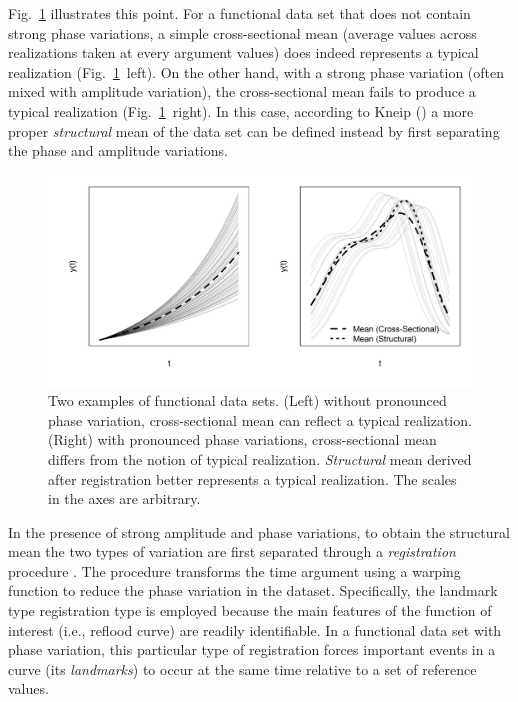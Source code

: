 Fig.~\ref{fig:illustrate_phase_variation} illustrates this point.
For a functional data set that does not contain strong phase variations, 
a simple cross-sectional mean (average values across realizations taken at every argument values) does indeed represents a typical realization (Fig.~\ref{fig:illustrate_phase_variation}~left).
On the other hand, with a strong phase variation (often mixed with amplitude variation), 
the cross-sectional mean fails to produce a typical realization (Fig.~\ref{fig:illustrate_phase_variation}~right).
In this case,
according to Kneip (\cite{Kneip1992}) a more proper \emph{structural} mean of the data set can be defined instead
by first separating the phase and amplitude variations.
\begin{figure}[bth]
	\centering
	\includegraphics[scale=0.48,trim={0 1cm 0 0},clip]{../figures/r-figures/illustratePhaseVariation.png}
	\caption[Variation in functional data sets, with and without phase variation]{Two examples of functional data sets. (Left) without pronounced phase variation, cross-sectional mean can reflect a typical realization. (Right) with pronounced phase variations, cross-sectional mean differs from the notion of typical realization. \emph{Structural} mean derived after registration better represents a typical realization. The scales in the axes are arbitrary.}
	\label{fig:illustrate_phase_variation}
\end{figure}

In the presence of strong amplitude and phase variations, to obtain the structural mean the two types of variation are first separated through a \emph{registration} procedure \cite{Wang1997,Ramsay1998}.
The procedure transforms the time argument using a warping function to reduce the phase variation in the dataset.
Specifically, the landmark type registration type is employed because the main features of the function of interest (i.e., reflood curve) are readily identifiable.
In a functional data set with phase variation, this particular type of registration forces important events in a curve (its \emph{landmarks}) to occur at the same time relative to a set of reference values.

